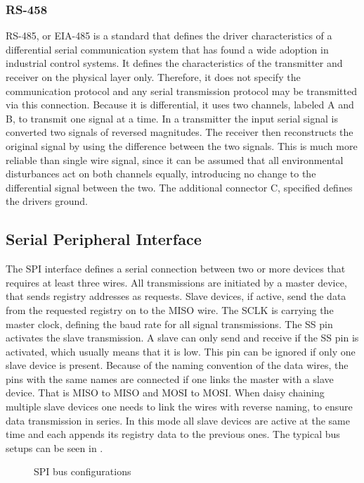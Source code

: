 \subsubsection{RS-458}
\acs{RS}-485, or EIA-485 is a standard that defines the driver characteristics of a differential serial communication system that has found a wide adoption in industrial control systems. It defines the characteristics of the transmitter and receiver on the physical layer only. Therefore, it does not specify the communication protocol and any serial transmission protocol may be transmitted via this connection. Because it is differential, it uses two channels, labeled A and B, to transmit one signal at a time. In a transmitter the input serial signal is converted two signals of reversed magnitudes. The receiver then reconstructs the original signal by using the difference between the two signals. This is much more reliable than single wire signal, since it can be assumed that all environmental disturbances act on both channels equally, introducing no change to the differential signal between the two. The additional connector C, specified defines the drivers ground.

\subsection{Serial Peripheral Interface}
The \ac{SPI} interface defines a serial connection between two or more devices that requires at least three wires. All transmissions are initiated by a master device, that sends registry addresses as requests. Slave devices, if active, send the data from the requested registry on to the \ac{MISO} wire. The \ac{SCLK} is carrying the master clock, defining the baud rate for all signal transmissions. The \ac{SS} pin activates the slave transmission. A slave can only send and receive if the \ac{SS} pin is activated, which usually means that it is low. This pin can be ignored if only one slave device is present. Because of the naming convention of the data wires, the pins with the same names are connected if one links the master with a slave device. That is \ac{MISO} to \ac{MISO} and \ac{MOSI} to \ac{MOSI}. When daisy chaining multiple slave devices one needs to link the wires with reverse naming, to ensure data transmission in series. In this mode all slave devices are active at the same time and each appends its registry data to the previous ones. The typical bus setups can be seen in .

\begin{figure}[!htb]
  \centering
  \hfill
  \caption[SPI bus configurations]{\ac{SPI} bus configurations%
    \label{fig:spi_bus}}
\end{figure}

